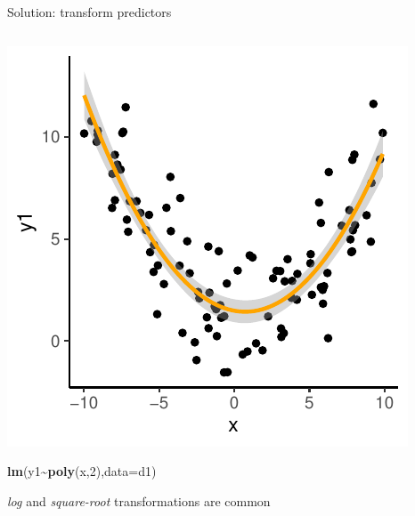 \documentclass[
  ignorenonframetext,
  aspectratio=169]{beamer}
\newenvironment{Shaded}{\begin{snugshade}}{\end{snugshade}}
\newcommand{\AttributeTok}[1]{\textcolor[rgb]{0.13,0.29,0.53}{#1}}
\newcommand{\DecValTok}[1]{\textcolor[rgb]{0.00,0.00,0.81}{#1}}
\newcommand{\FunctionTok}[1]{\textcolor[rgb]{0.13,0.29,0.53}{\textbf{#1}}}
\newcommand{\NormalTok}[1]{#1}
\newcommand{\SpecialCharTok}[1]{\textcolor[rgb]{0.81,0.36,0.00}{\textbf{#1}}}
\let\oldShaded\Shaded %
\let\endoldShaded\endShaded
\renewenvironment{Shaded}{\scriptsize\oldShaded}{\endoldShaded}
\begin{document}
\begin{frame}[fragile]{Solution: transform predictors}
\protect\hypertarget{solution-transform-predictors}{}
\begin{columns}[T]
\begin{column}{0.48\textwidth}
\includegraphics{03-Lecture_files/figure-beamer/unnamed-chunk-30-1.pdf}

\begin{Shaded}
\begin{Highlighting}[]
\FunctionTok{lm}\NormalTok{(y1}\SpecialCharTok{\textasciitilde{}}\FunctionTok{poly}\NormalTok{(x,}\DecValTok{2}\NormalTok{),}\AttributeTok{data=}\NormalTok{d1)}
\end{Highlighting}
\end{Shaded}

\small

\emph{log} and \emph{square-root} transformations are common
\end{column}


\end{columns}
\end{frame}
\end{document}
